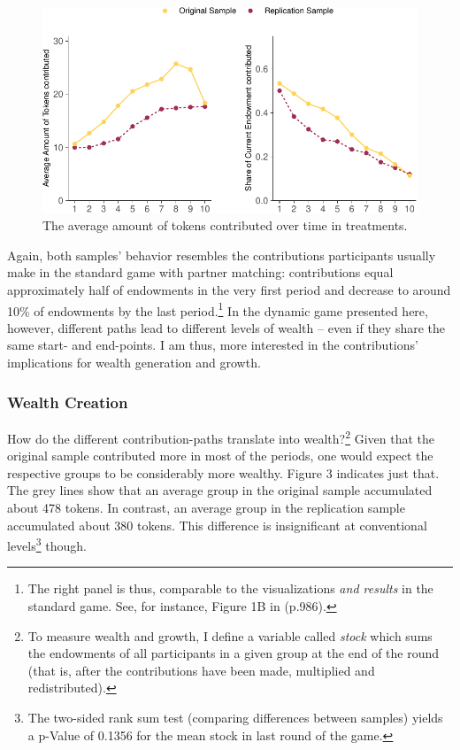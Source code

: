 \documentclass[
  authoryear,
  preprint,
  3p]{elsarticle}
\begin{document}
\begin{figure}

{\centering \includegraphics{paper_files/figure-pdf/plotShareOfContributions-1.pdf}

}

\caption{The average amount of tokens contributed over time in
treatments.}

\end{figure}

Again, both samples' behavior resembles the contributions participants
usually make in the standard game with partner matching: contributions
equal approximately half of endowments in the very first period and
decrease to around 10\% of endowments by the last period.\footnote{The
  right panel is thus, comparable to the visualizations \emph{and
  results} in the standard game. See, for instance, Figure 1B in
  \citet{fehrgaechter2000} (p.986).} In the dynamic game presented here,
however, different paths lead to different levels of wealth -- even if
they share the same start- and end-points. I am thus, more interested in
the contributions' implications for wealth generation and growth.

\hypertarget{wealth-creation}{%
\subsubsection{Wealth Creation}\label{wealth-creation}}

How do the different contribution-paths translate into
wealth?\footnote{To measure wealth and growth, I define a variable
  called \emph{stock} which sums the endowments of all participants in a
  given group at the end of the round (that is, after the contributions
  have been made, multiplied and redistributed).} Given that the
original sample contributed more in most of the periods, one would
expect the respective groups to be considerably more wealthy. Figure 3
indicates just that. The grey lines show that an average group in the
original sample accumulated about 478 tokens. In contrast, an average
group in the replication sample accumulated about 380 tokens. This
difference is insignificant at conventional levels\footnote{The
  two-sided rank sum test (comparing differences between samples) yields
  a p-Value of 0.1356 for the mean stock in last round of the game.}
though.
\end{document}
